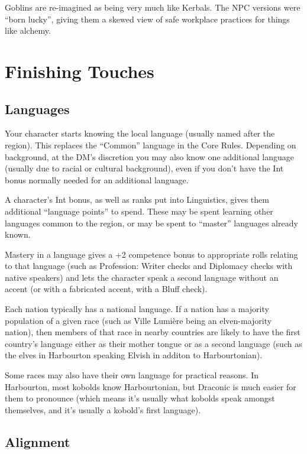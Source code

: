 Goblins are re-imagined as being very much like Kerbals. The NPC versions
were ``born lucky'', giving them a skewed view of safe workplace practices
for things like alchemy.

%
%
\clearpage
\section{Finishing Touches}

%
\subsection{Languages}

Your character starts knowing the local language (usually named after the
region). This replaces the ``Common'' language in the Core Rules. Depending
on background, at the DM's discretion you may also know one additional
language (usually due to racial or cultural background), even if you don't
have the Int bonus normally needed for an additional language.

A character's Int bonus, as well as ranks put into Linguistics, gives them
additional ``language points'' to spend. These may be spent learning other
languages common to the region, or may be spent to ``master'' languages
already known.

Mastery in a language gives a +2 competence bonus to appropriate rolls
relating to that language (such as Profession: Writer checks and Diplomacy
checks with native speakers) and lets the character speak a second language
without an accent (or with a fabricated accent, with a Bluff check).

Each nation typically has a national language. If a nation has a majority
population of a given race (such as Ville Lumi\`{e}re being an elven-majority
nation), then members of that race in nearby countries are likely to have
the first country's language either as their mother tongue or as a second
language (such as the elves in Harbourton speaking Elvish in additon to
Harbourtonian).

Some races may also have their own language for practical reasons. In
Harbourton, most kobolds know Harbourtonian, but Draconic is much easier
for them to pronounce (which means it's usually what kobolds speak amongst
themselves, and it's usually a kobold's first language).

%
\subsection{Alignment}

